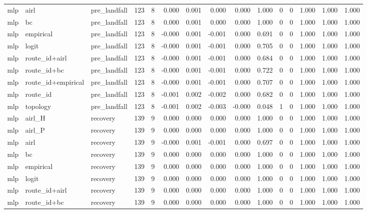 \begin{tabular}{lllrrrrrrrrrrrr}
mlp & airl & pre_landfall & 123 & 8 & 0.000 & 0.001 & 0.000 & 0.000 & 1.000 & 0 & 0 & 1.000 & 1.000 & 1.000 \\
mlp & bc & pre_landfall & 123 & 8 & 0.000 & 0.001 & 0.000 & 0.000 & 1.000 & 0 & 0 & 1.000 & 1.000 & 1.000 \\
mlp & empirical & pre_landfall & 123 & 8 & -0.000 & 0.001 & -0.001 & 0.000 & 0.691 & 0 & 0 & 1.000 & 1.000 & 1.000 \\
mlp & logit & pre_landfall & 123 & 8 & -0.000 & 0.001 & -0.001 & 0.000 & 0.705 & 0 & 0 & 1.000 & 1.000 & 1.000 \\
mlp & route_id+airl & pre_landfall & 123 & 8 & -0.000 & 0.001 & -0.001 & 0.000 & 0.684 & 0 & 0 & 1.000 & 1.000 & 1.000 \\
mlp & route_id+bc & pre_landfall & 123 & 8 & -0.000 & 0.001 & -0.001 & 0.000 & 0.722 & 0 & 0 & 1.000 & 1.000 & 1.000 \\
mlp & route_id+empirical & pre_landfall & 123 & 8 & -0.000 & 0.001 & -0.001 & 0.000 & 0.707 & 0 & 0 & 1.000 & 1.000 & 1.000 \\
mlp & route_id & pre_landfall & 123 & 8 & -0.001 & 0.002 & -0.002 & 0.000 & 0.682 & 0 & 0 & 1.000 & 1.000 & 1.000 \\
mlp & topology & pre_landfall & 123 & 8 & -0.001 & 0.002 & -0.003 & -0.000 & 0.048 & 1 & 0 & 1.000 & 1.000 & 1.000 \\
mlp & airl_H & recovery & 139 & 9 & 0.000 & 0.000 & 0.000 & 0.000 & 1.000 & 0 & 0 & 1.000 & 1.000 & 1.000 \\
mlp & airl_P & recovery & 139 & 9 & 0.000 & 0.000 & 0.000 & 0.000 & 1.000 & 0 & 0 & 1.000 & 1.000 & 1.000 \\
mlp & airl & recovery & 139 & 9 & -0.000 & 0.001 & -0.001 & 0.000 & 0.697 & 0 & 0 & 1.000 & 1.000 & 1.000 \\
mlp & bc & recovery & 139 & 9 & 0.000 & 0.000 & 0.000 & 0.000 & 1.000 & 0 & 0 & 1.000 & 1.000 & 1.000 \\
mlp & empirical & recovery & 139 & 9 & 0.000 & 0.000 & 0.000 & 0.000 & 1.000 & 0 & 0 & 1.000 & 1.000 & 1.000 \\
mlp & logit & recovery & 139 & 9 & 0.000 & 0.000 & 0.000 & 0.000 & 1.000 & 0 & 0 & 1.000 & 1.000 & 1.000 \\
mlp & route_id+airl & recovery & 139 & 9 & 0.000 & 0.000 & 0.000 & 0.000 & 1.000 & 0 & 0 & 1.000 & 1.000 & 1.000 \\
mlp & route_id+bc & recovery & 139 & 9 & 0.000 & 0.000 & 0.000 & 0.000 & 1.000 & 0 & 0 & 1.000 & 1.000 & 1.000 \\

\end{tabular}
